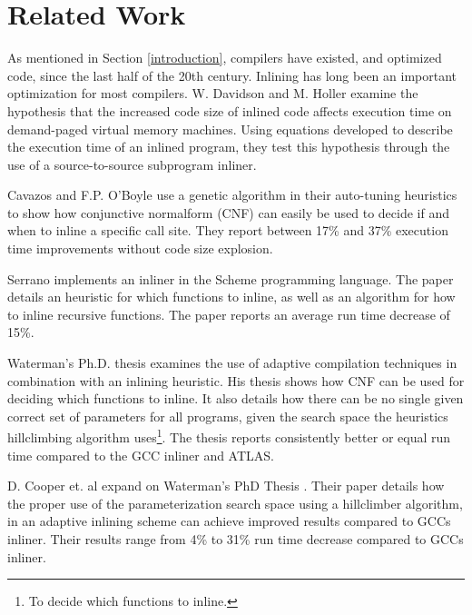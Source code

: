 
\clearpage
\section{Related Work}

As mentioned in Section \ref{introduction}, compilers have existed, and
optimized code, since the last half of the 20th century. Inlining has long been
an important optimization for most compilers. W. Davidson and M. Holler
\cite{SubprogInlining} examine the hypothesis that the increased code size of
inlined code affects execution time on demand-paged virtual memory machines.
Using equations developed to describe the execution time of an inlined program,
they test this hypothesis through the use of a source-to-source subprogram
inliner.

Cavazos and F.P. O'Boyle \cite{AutoTuningJavaHeuristics} use a genetic algorithm
in their auto-tuning heuristics to show how conjunctive normalform (CNF) can
easily be used to decide if and when to inline a specific call site. They report
between 17\% and 37\% execution time improvements without code size explosion.

Serrano \cite{InlineWhenHowSerrano} implements an inliner in the Scheme
programming language. The paper details an heuristic for which functions to
inline, as well as an algorithm for how to inline recursive functions. The paper
reports an average run time decrease of 15\%.


Waterman's Ph.D. thesis \cite{AdaptvCompilAndInlingWaterman} examines the use of
adaptive compilation techniques in combination with an inlining heuristic. His
thesis shows how CNF can be used for deciding which functions to inline. It also
details how there can be no single given correct set of parameters for all
programs, given the search space the heuristics hillclimbing algorithm
uses\footnote{To decide which functions to inline.}. The thesis reports
consistently better or equal run time compared to the GCC inliner and ATLAS.

D. Cooper et. al \cite{AdaptvStratInlSubst} expand on Waterman's PhD Thesis
\cite{AdaptvCompilAndInlingWaterman}. Their paper details how the proper use of
the parameterization search space using a hillclimber algorithm, in an adaptive
inlining scheme can achieve improved results compared to GCCs inliner. Their
results range from 4\% to 31\% run time decrease compared to GCCs inliner.

